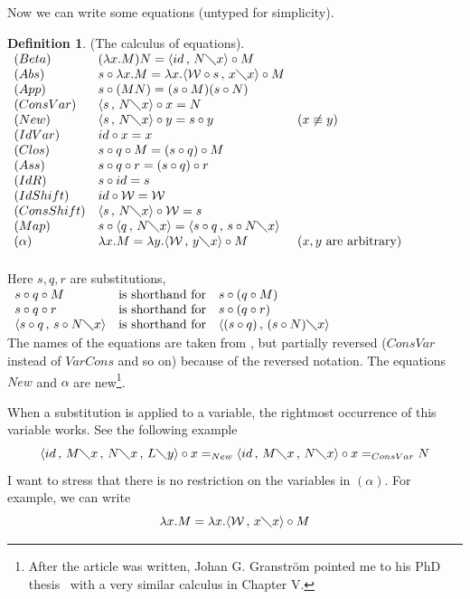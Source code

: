 \documentclass[11pt]{amsart}
\theoremstyle{plain}
\theoremstyle{definition}
\newtheorem{definition}[theorem]{Definition}
\theoremstyle{remark}
\numberwithin{equation}{section}
\newcommand{\ci}{\circ}
\newcommand{\mi}{\,,\,}
\newcommand{\is}{\diagdown}
\newcommand{\la}{\langle}
\newcommand{\ra}{\rangle}
\renewcommand{\pi}{\mathcal{W}}
\begin{document}
Now we can write some  equations (untyped for simplicity).
\newpage
\begin{definition}(The calculus of equations).\label{rav}\\[5pt]
 $
\begin{array}{lll}
(Beta) & (\lambda x.M)N= \langle id\mi N\is x\rangle\ci M &\\
(Abs) & s\ci \lambda x.M=\lambda x.\langle \pi\ci s\mi x\is
x\rangle\ci M &\\
(App) & s\ci (MN)=(s\ci  M)(s\ci  N) &\\
(ConsVar) & \langle s\mi N\is x\rangle\ci x= N &\\
(New) & \langle s\mi N\is x\rangle\ci y=  s\ci y & (x\not\equiv y)\\
(IdVar) &  id\ci x= x &\\
(Clos) & s\ci q\ci M= (s\ci q)\ci M &\\
(Ass) & s\ci q\ci  r= (s\ci q)\ci r &\\
(IdR) & s\ci id= s &\\
(IdShift) & id\ci \pi=\pi &\\
(ConsShift) & \langle s\mi N\is x\rangle\ci \pi= s &\\
(Map) & s\ci \langle q\mi N\is x\rangle=\langle
s\ci q \mi s\ci N\is x\rangle &\\
(\alpha) & \lambda x.M=\lambda
y.\langle\pi\mi y\is x\rangle\ci M & (x,y \text{ are arbitrary})\\
[5pt]
\end{array}$
\end{definition}

Here $s,q,r$ are substitutions,\\
$\begin{array}{lll}
 s\ci q\ci M & \text{is shorthand for} &
s\ci(q\ci M)\\
 s\ci q\ci r & \text{is shorthand for} & s\ci(q\ci r)\\
 \la
s\ci q\mi s\ci N\is x\ra & \text{is shorthand for} & \la (s\ci
q)\mi(s\ci N)\is x\ra
\end{array}$\\

 The names of the equations are taken from \cite{Abadi},
but partially reversed ($ConsVar$ instead of $VarCons$ and so on)
because of the reversed notation. The equations $New$  and
$\alpha$ are new\footnote{After the article was written, Johan G. 
Granstr\"{o}m pointed me to his PhD thesis~\cite{Granstrom} with a
very similar calculus in Chapter V.}.

When a substitution is applied to a variable, the rightmost
occurrence of this variable works. See the following example
$$\la id\mi M\is x\mi N\is x\mi L\is y\ra\ci x=_{New}\la id\mi M\is
x\mi N\is x\ra\ci x=_{ConsVar}N$$
 I want to stress that there is
no restriction on the variables in $(\alpha)$. For example, we can
write
 $$\lambda x.M=\lambda
x.\la\pi\mi x\is x\ra\ci M$$
\end{document}
